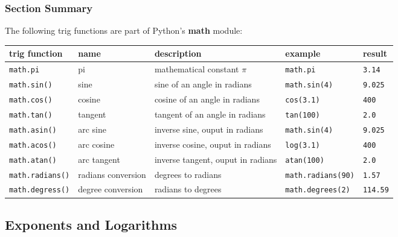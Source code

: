 \documentclass{book}
\newcommand{\passthrough}[1]{#1}
\begin{document}
    
        \hypertarget{section-summary}{%
\subsubsection{Section Summary}\label{section-summary}}

The following trig functions are part of Python's \textbf{math} module:

\begin{longtable}[]{@{}lllll@{}}
\toprule
trig function & name & description & example & result\tabularnewline
\midrule
\endhead
\passthrough{\lstinline!math.pi!} & pi & mathematical constant \(\pi\) &
\passthrough{\lstinline!math.pi!} &
\passthrough{\lstinline!3.14!}\tabularnewline
\passthrough{\lstinline!math.sin()!} & sine & sine of an angle in
radians & \passthrough{\lstinline!math.sin(4)!} &
\passthrough{\lstinline!9.025!}\tabularnewline
\passthrough{\lstinline!math.cos()!} & cosine & cosine of an angle in
radians & \passthrough{\lstinline!cos(3.1)!} &
\passthrough{\lstinline!400!}\tabularnewline
\passthrough{\lstinline!math.tan()!} & tangent & tangent of an angle in
radians & \passthrough{\lstinline!tan(100)!} &
\passthrough{\lstinline!2.0!}\tabularnewline
\passthrough{\lstinline!math.asin()!} & arc sine & inverse sine, ouput
in radians & \passthrough{\lstinline!math.sin(4)!} &
\passthrough{\lstinline!9.025!}\tabularnewline
\passthrough{\lstinline!math.acos()!} & arc cosine & inverse cosine,
ouput in radians & \passthrough{\lstinline!log(3.1)!} &
\passthrough{\lstinline!400!}\tabularnewline
\passthrough{\lstinline!math.atan()!} & arc tangent & inverse tangent,
ouput in radians & \passthrough{\lstinline!atan(100)!} &
\passthrough{\lstinline!2.0!}\tabularnewline
\passthrough{\lstinline!math.radians()!} & radians conversion & degrees
to radians & \passthrough{\lstinline!math.radians(90)!} &
\passthrough{\lstinline!1.57!}\tabularnewline
\passthrough{\lstinline!math.degress()!} & degree conversion & radians
to degrees & \passthrough{\lstinline!math.degrees(2)!} &
\passthrough{\lstinline!114.59!}\tabularnewline
\bottomrule
\end{longtable}
    




    
        \hypertarget{exponents-and-logarithms}{%
\subsection{Exponents and Logarithms}\label{exponents-and-logarithms}}
\end{document}
